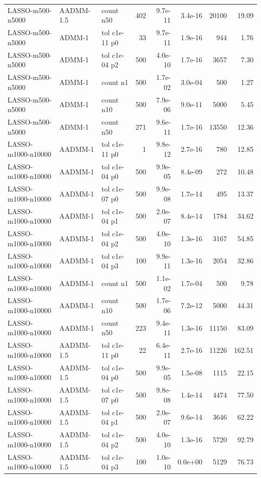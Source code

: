 \begin{tabular}{lllrrrrr}
LASSO-m500-n5000 & AADMM-1.5 & count n50 & 402 & 9.7e-11 & 3.4e-16 & 20100 & 19.09\\
LASSO-m500-n5000 & ADMM-1 & tol c1e-11 p0 & 33 & 9.7e-11 & 1.9e-16 & 944 & 1.76\\
LASSO-m500-n5000 & ADMM-1 & tol c1e-04 p2 & 500 & 4.0e-10 & 1.7e-16 & 3657 & 7.30\\
LASSO-m500-n5000 & ADMM-1 & count n1 & 500 & 1.7e-02 & 3.0e-04 & 500 & 1.27\\
LASSO-m500-n5000 & ADMM-1 & count n10 & 500 & 7.9e-06 & 9.0e-11 & 5000 & 5.45\\
LASSO-m500-n5000 & ADMM-1 & count n50 & 271 & 9.6e-11 & 1.7e-16 & 13550 & 12.36\\
LASSO-m1000-n10000 & AADMM-1 & tol c1e-11 p0 & 1 & 9.8e-12 & 2.7e-16 & 780 & 12.85\\
LASSO-m1000-n10000 & AADMM-1 & tol c1e-04 p0 & 500 & 9.9e-05 & 8.4e-09 & 272 & 10.48\\
LASSO-m1000-n10000 & AADMM-1 & tol c1e-07 p0 & 500 & 9.9e-08 & 1.7e-14 & 495 & 13.37\\
LASSO-m1000-n10000 & AADMM-1 & tol c1e-04 p1 & 500 & 2.0e-07 & 8.4e-14 & 1784 & 34.62\\
LASSO-m1000-n10000 & AADMM-1 & tol c1e-04 p2 & 500 & 4.0e-10 & 1.3e-16 & 3167 & 54.85\\
LASSO-m1000-n10000 & AADMM-1 & tol c1e-04 p3 & 100 & 9.9e-11 & 1.3e-16 & 2054 & 32.86\\
LASSO-m1000-n10000 & AADMM-1 & count n1 & 500 & 1.1e-02 & 1.7e-04 & 500 & 9.78\\
LASSO-m1000-n10000 & AADMM-1 & count n10 & 500 & 1.7e-06 & 7.2e-12 & 5000 & 44.31\\
LASSO-m1000-n10000 & AADMM-1 & count n50 & 223 & 9.4e-11 & 1.3e-16 & 11150 & 83.09\\
LASSO-m1000-n10000 & AADMM-1.5 & tol c1e-11 p0 & 22 & 6.4e-11 & 2.7e-16 & 11226 & 162.51\\
LASSO-m1000-n10000 & AADMM-1.5 & tol c1e-04 p0 & 500 & 9.9e-05 & 1.5e-08 & 1115 & 22.15\\
LASSO-m1000-n10000 & AADMM-1.5 & tol c1e-07 p0 & 500 & 9.8e-08 & 1.4e-14 & 4474 & 77.50\\
LASSO-m1000-n10000 & AADMM-1.5 & tol c1e-04 p1 & 500 & 2.0e-07 & 9.6e-14 & 3646 & 62.22\\
LASSO-m1000-n10000 & AADMM-1.5 & tol c1e-04 p2 & 500 & 4.0e-10 & 1.3e-16 & 5720 & 92.79\\
LASSO-m1000-n10000 & AADMM-1.5 & tol c1e-04 p3 & 100 & 1.0e-10 & 0.0e+00 & 5129 & 76.73\\

\end{tabular}

